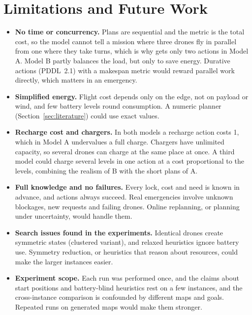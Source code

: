 \documentclass[11pt,a4paper]{article}
\newcommand{\p}[1]{\texttt{\detokenize{#1}}}
\begin{document}
\section{Limitations and Future Work}
\label{sec:limitations}

\begin{itemize}
  \item \textbf{No time or concurrency.} Plans are sequential and the metric
    is the total cost, so the model cannot tell a mission where three drones
    fly in parallel from one where they take turns, which is why \p{droneC}
    gets only two actions in Model A. Model B partly balances the load, but
    only to save energy. Durative actions (PDDL~2.1) with a makespan metric
    would reward parallel work directly, which matters in an emergency.
  \item \textbf{Simplified energy.} Flight cost depends only on the edge, not
    on payload or wind, and few battery levels round consumption. A numeric
    planner (Section~\ref{sec:literature}) could use exact values.
  \item \textbf{Recharge cost and chargers.} In both models a recharge action
    costs 1, which in Model A undervalues a full charge. Chargers have
    unlimited capacity, so several drones can charge at the same place at
    once. A third model could charge several levels in one action at a cost
    proportional to the levels, combining the realism of B with the short
    plans of A.
  \item \textbf{Full knowledge and no failures.} Every lock, cost and need is
    known in advance, and actions always succeed. Real emergencies involve
    unknown blockages, new requests and failing drones. Online replanning, or
    planning under uncertainty, would handle them.
  \item \textbf{Search issues found in the experiments.} Identical drones
    create symmetric states (clustered variant), and relaxed heuristics
    ignore battery use. Symmetry reduction, or heuristics that reason about
    resources, could make the larger instances easier.
  \item \textbf{Experiment scope.} Each run was performed once, and the
    claims about start positions and battery-blind heuristics rest on a few
    instances, and the cross-instance comparison is confounded by different
    maps and goals. Repeated runs on generated maps would make them stronger.
\end{itemize}
\end{document}

